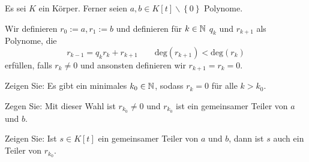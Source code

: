 \begin{Problem}
	Es sei $K$ ein Körper. Ferner seien $a,b\in K[t]\backslash \left\{ 0 \right\} $ Polynome. 

	Wir definieren $r_0:=a,r_1:=b$ und definieren f\"{u}r $k\in \mathbb{N}$ $q_k$ und $r_{k+1}$ als Polynome, die
	\[
		r_{k-1}=q_kr_k+r_{k+1}\qquad \text{deg}(r_{k+1})<\text{deg}(r_k)
	\]
	erfüllen, falls $r_k\neq 0$ und ansonsten definieren wir $r_{k+1}=r_k=0$.
	\begin{parts}
		\item Zeigen Sie: Es gibt ein minimales $k_0\in \mathbb{N}$, sodass $r_k=0$ f\"{u}r alle $k>k_0$.
		\item Zegen Sie: Mit dieser Wahl ist $r_{k_0}\neq 0$ und $r_{k_0}$ ist ein gemeinsamer Teiler von $a$ und $b$.
		\item Zeigen Sie: Ist $s\in K[t]$ ein gemeinsamer Teiler von $a$ und $b$, dann ist $s$ auch ein Teiler von $r_{k_0}$.
	\end{parts}
\end{Problem}
